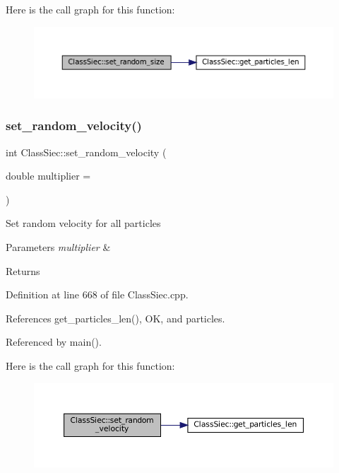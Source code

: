 Here is the call graph for this function\+:
\nopagebreak
\begin{figure}[H]
\begin{center}
\leavevmode
\includegraphics[width=350pt]{classClassSiec_a4b63c475330f7b0c96a244f55a624fac_cgraph}
\end{center}
\end{figure}
\mbox{\label{classClassSiec_a29968ccc2e9318ca89ae0b3dac4a390d}} 
\subsubsection{\texorpdfstring{set\+\_\+random\+\_\+velocity()}{set\_random\_velocity()}}
{\footnotesize\ttfamily int Class\+Siec\+::set\+\_\+random\+\_\+velocity (\begin{DoxyParamCaption}\item[{double}]{multiplier = {} }\end{DoxyParamCaption})}

Set random velocity for all particles 
\begin{DoxyParams}{Parameters}
{\em multiplier} & \\
\hline
\end{DoxyParams}
\begin{DoxyReturn}{Returns}

\end{DoxyReturn}


Definition at line 668 of file Class\+Siec.\+cpp.



References get\+\_\+particles\+\_\+len(), OK, and particles.



Referenced by main().

Here is the call graph for this function\+:
\nopagebreak
\begin{figure}[H]
\begin{center}
\leavevmode
\includegraphics[width=350pt]{classClassSiec_a29968ccc2e9318ca89ae0b3dac4a390d_cgraph}
\end{center}
\end{figure}
\mbox{\label{classClassSiec_a0de17762248441c53936ee7924776052}} 
